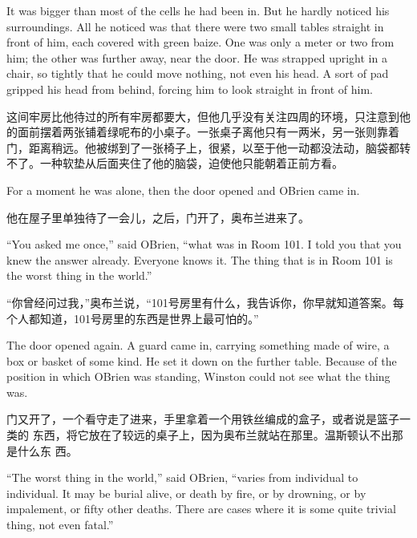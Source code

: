 \begin{paracol}{2}
\switchcolumn*

It was bigger than most of the cells he had been in. But he hardly
noticed his surroundings. All he noticed was that there were two small
tables straight in front of him, each covered with green baize. One was
only a meter or two from him; the other was further away, near the door.
He was strapped upright in a chair, so tightly that he could move
nothing, not even his head. A sort of pad gripped his head from behind,
forcing him to look straight in front of him.

\switchcolumn

这间牢房比他待过的所有牢房都要大，但他几乎没有关注四周的环境，只注意到他的面前摆着两张铺着绿呢布的小桌子。一张桌子离他只有一两米，另一张则靠着门，距离稍远。他被绑到了一张椅子上，很紧，以至于他一动都没法动，脑袋都转不了。一种软垫从后面夹住了他的脑袋，迫使他只能朝着正前方看。

\switchcolumn*

For a moment he was alone, then the door opened and
O\textquotesingle Brien came in.

\switchcolumn

他在屋子里单独待了一会儿，之后，门开了，奥布兰进来了。

\switchcolumn*

``You asked me once,'' said O\textquotesingle Brien, ``what was in Room
101. I told you that you knew the answer already. Everyone knows it. The
thing that is in Room 101 is the worst thing in the world.''

\switchcolumn

``你曾经问过我，''奥布兰说，``101号房里有什么，我告诉你，你早就知道答案。每
个人都知道，101号房里的东西是世界上最可怕的。''

\switchcolumn*

The door opened again. A guard came in, carrying something made of wire,
a box or basket of some kind. He set it down on the further table.
Because of the position in which O\textquotesingle Brien was standing,
Winston could not see what the thing was.

\switchcolumn

门又开了，一个看守走了进来，手里拿着一个用铁丝编成的盒子，或者说是篮子一类的
东西，将它放在了较远的桌子上，因为奥布兰就站在那里。温斯顿认不出那是什么东
西。

\switchcolumn*

``The worst thing in the world,'' said O\textquotesingle Brien, ``varies
from individual to individual. It may be burial alive, or death by fire,
or by drowning, or by impalement, or fifty other deaths. There are cases
where it is some quite trivial thing, not even fatal.''


\end{paracol}
